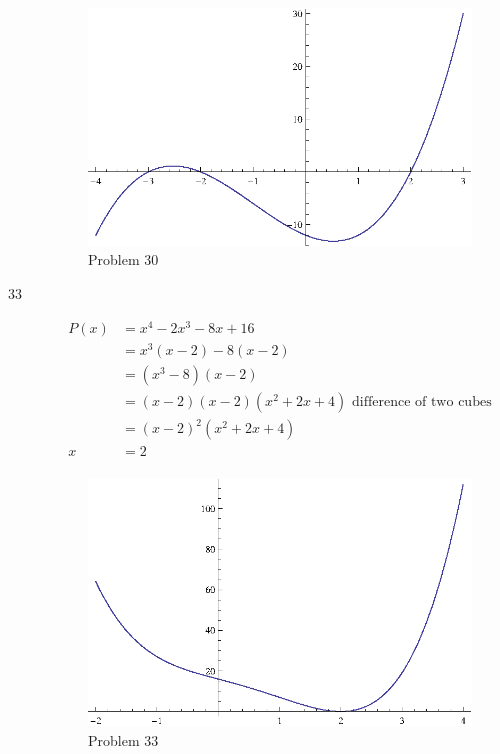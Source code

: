 \documentclass{exam}
\begin{document}
\begin{description}
      \begin{figure}[H]
        \centering
        \includegraphics[scale=0.9]{problem30.eps}
        \caption*{Problem 30}
      \end{figure}

    \pagebreak

    \item[33] 
      \begin{align*}
        P(x) &= x^4 - 2x^3 - 8x + 16 \\
             &= x^3(x - 2) - 8(x - 2) \\
             &= (x^3 - 8)(x - 2) \\
             &= (x - 2)(x - 2)(x^2 + 2x + 4) \text{ difference of two cubes} \\
             &= (x - 2)^2(x^2 + 2x + 4) \\
        x    &= 2 \\
      \end{align*}
      
      \begin{figure}[H]
        \centering
        \includegraphics[scale=0.9]{problem33.eps}
        \caption*{Problem 33}
      \end{figure}


\end{description}
\end{document}
